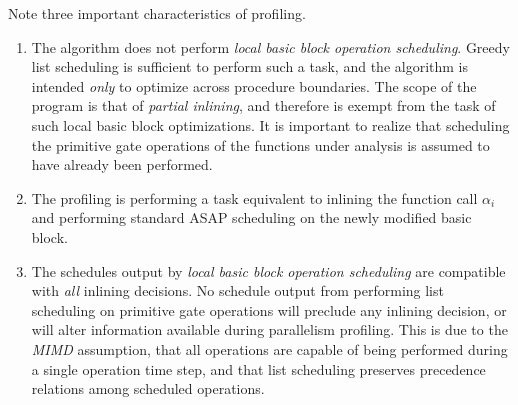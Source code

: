 \documentclass[12pt,twoside]{article}
\begin{document}
	Note three important characteristics of profiling. 
	\begin{enumerate}
	\item The algorithm does not perform \emph{local basic block operation scheduling}. Greedy list scheduling is sufficient to perform such a task, and the algorithm is intended \emph{only} to optimize across procedure boundaries. The scope of the program is that of \emph{partial inlining}, and therefore is exempt from the task of such local basic block optimizations. It is important to realize that scheduling the primitive gate operations of the functions under analysis is assumed to have already been performed.   
	\item The profiling is performing a task equivalent to inlining the function call $\alpha_i$ and performing standard ASAP scheduling on the newly modified basic block. 
	\item The schedules output by \emph{local basic block operation scheduling} are compatible with \emph{all} inlining decisions. No schedule output from performing list scheduling on primitive gate operations will preclude any inlining decision, or will alter information available during parallelism profiling. This is due to the \emph{MIMD} assumption, that all operations are capable of being performed during a single operation time step, and that list scheduling preserves precedence relations among scheduled operations. 
	\end{enumerate}
\end{document}
